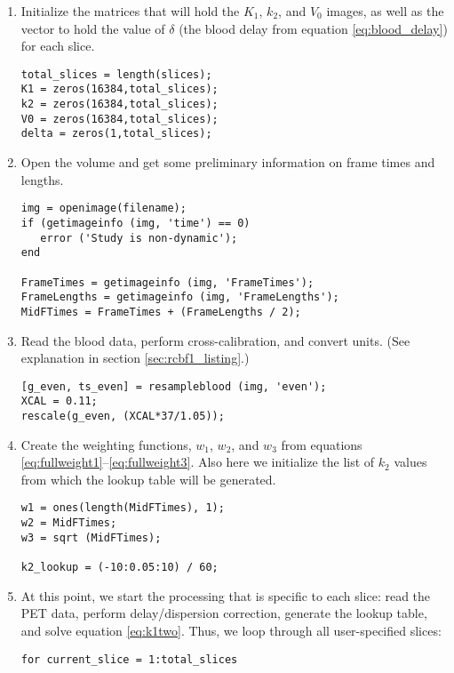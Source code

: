 \begin{enumerate}
\item Initialize the matrices that will hold the $K_1$, $k_2$, and
  $V_0$ images, as well as the vector to hold the value of $\delta$
  (the blood delay from equation \ref{eq:blood_delay}) for each slice.
  \begin{verbatim}
total_slices = length(slices);
K1 = zeros(16384,total_slices);
k2 = zeros(16384,total_slices);
V0 = zeros(16384,total_slices);
delta = zeros(1,total_slices);
  \end{verbatim}

\item Open the volume and get some preliminary information on frame
  times and lengths.
  \begin{verbatim}
img = openimage(filename);
if (getimageinfo (img, 'time') == 0)
   error ('Study is non-dynamic');
end

FrameTimes = getimageinfo (img, 'FrameTimes');
FrameLengths = getimageinfo (img, 'FrameLengths');
MidFTimes = FrameTimes + (FrameLengths / 2);
  \end{verbatim}

\item Read the blood data, perform cross-calibration, and convert
  units.  (See explanation in section \ref{sec:rcbf1_listing}.)
  \begin{verbatim}
[g_even, ts_even] = resampleblood (img, 'even');
XCAL = 0.11;
rescale(g_even, (XCAL*37/1.05));
  \end{verbatim}

\item Create the weighting functions, $w_1$, $w_2$, and $w_3$ from
  equations \ref{eq:fullweight1}--\ref{eq:fullweight3}.  Also here we
  initialize the list of $k_2$ values from which the lookup table will
  be generated.

  \begin{verbatim}
w1 = ones(length(MidFTimes), 1);
w2 = MidFTimes;
w3 = sqrt (MidFTimes);

k2_lookup = (-10:0.05:10) / 60;
  \end{verbatim}


\item At this point, we start the processing that is specific to each
  slice: read the PET data, perform delay/dispersion correction,
  generate the lookup table, and solve equation \ref{eq:k1two}.  Thus,
  we loop through all user-specified slices:
  \begin{verbatim}
for current_slice = 1:total_slices
  \end{verbatim}


\end{enumerate}
